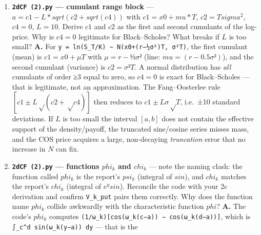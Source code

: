 \documentclass[
  11pt,
]{article}
\begin{document}
\begin{enumerate}
  function of \texttt{y\ =\ ln(S\_T/K)} and not of \(ln(S_T)\)? Where
  does \texttt{x\ =\ x0\ =\ log(S0/K)} enter? \textbf{A.} Under Q,
  \(ln(S_T) = ln(S0) + (r − ½σ²)T + σ√T Z\) is normal with mean
  \(ln(S0)+(r−½σ²)T\) and variance \(σ²T\). Define
  \texttt{y\ =\ ln(S\_T/K)\ =\ ln(S\_T)\ −\ ln\ K}; this just shifts the
  mean by \(−ln K\), giving mean
  \texttt{ln(S0/K)\ +\ (r−½σ²)T\ =\ x0\ +\ (r−½σ²)T}. The CF of a normal
  \(N(μ_y, σ²T)\) is \(exp(iωμ_y − ½σ²T ω²)\), exactly the return value.
  So it is the CF of \texttt{y\ =\ ln(S\_T/K)} (centred on the strike)
  precisely because \(mu_y\) carries \texttt{x\ =\ x0\ =\ ln(S0/K)};
  that \(x\) is the only place the spot/strike ratio enters, and it is
  what makes the expansion be of the log-\emph{moneyness} rather than
  the raw log-price.
\item
  \textbf{\texttt{2dCF\ (2).py} --- cumulant range block} ---
  \(a = c1 - L*sqrt(c2 + sqrt(c4))\) with \(c1 = x0 + mu*T\),
  \(c2 = T sigma^2\), \(c4 = 0\), \(L = 10\). Derive \(c1\) and \(c2\)
  as the first and second cumulants of the log-price. Why is \(c4 = 0\)
  legitimate for Black--Scholes? What breaks if \(L\) is too small?
  \textbf{A.} For
  \texttt{y\ =\ ln(S\_T/K)\ \textasciitilde{}\ N(x0+(r−½σ²)T,\ σ²T)},
  the first cumulant (mean) is \(c1 = x0 + μT\) with \(μ = r−½σ²\)
  (line: \(mu = (r−0.5σ²)\)), and the second cumulant (variance) is
  \(c2 = σ²T\). A normal distribution has \emph{all} cumulants of order
  ≥3 equal to zero, so \(c4 = 0\) is exact for Black--Scholes --- that
  is legitimate, not an approximation. The Fang--Oosterlee rule
  \([c1 ± L√(c2+√c4)]\) then reduces to \(c1 ± Lσ√T\), i.e.~±10 standard
  deviations. If \(L\) is too small the interval \([a,b]\) does not
  contain the effective support of the density/payoff, the truncated
  sine/cosine series misses mass, and the COS price acquires a large,
  non-decaying \emph{truncation} error that no increase in \(N\) can
  fix.
\item
  \textbf{\texttt{2dCF\ (2).py} --- functions \(phi_k\) and \(chi_k\)}
  --- note the naming clash: the function called \(phi_k\) is the
  report's \(psi_k\) (integral of \(sin\)), and \(chi_k\) matches the
  report's \(chi_k\) (integral of \(e^y sin\)). Reconcile the code with
  your 2c derivation and confirm \texttt{V\_k\_put} pairs them
  correctly. Why does the function name \(phi_k\) collide awkwardly with
  the characteristic function \(phi\)? \textbf{A.} The code's \(phi_k\)
  computes \texttt{(1/ω\_k){[}cos(ω\_k(c−a))\ −\ cos(ω\_k(d−a)){]}},
  which is \texttt{∫\_c\^{}d\ sin(ω\_k(y−a))\ dy} --- that is the

\end{enumerate}
\end{document}
